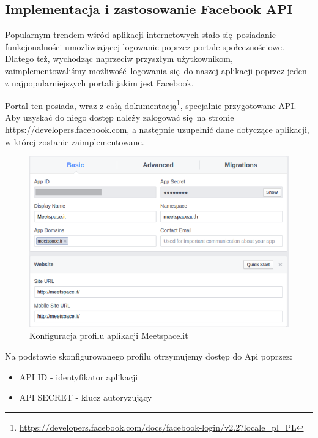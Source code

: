   

\subsection{Implementacja i zastosowanie Facebook API}
Popularnym trendem wśród aplikacji internetowych stało się posiadanie funkcjonalności umożliwiającej logowanie poprzez portale społecznościowe. Dlatego też, wychodząc naprzeciw przyszłym użytkownikom, zaimplementowaliśmy możliwość logowania się do naszej aplikacji poprzez jeden z najpopularniejszych portali jakim jest Facebook.

Portal ten posiada, wraz z całą dokumentacją\footnote{\url{https://developers.facebook.com/docs/facebook-login/v2.2?locale=pl\_PL}}, specjalnie przygotowane API. Aby uzyskać do niego dostęp należy zalogować się na stronie \url{https://developers.facebook.com}, a następnie uzupełnić dane dotyczące aplikacji, w której zostanie zaimplementowane. \\

\begin{figure}[h]
  \centering
    \includegraphics[scale=0.65]{images/fb_settings.png}
  \caption{Konfiguracja profilu aplikacji Meetspace.it}
\end{figure}

\clearpage

Na podstawie skonfigurowanego profilu otrzymujemy dostęp do Api poprzez:

\begin{itemize}
  \item API ID - identyfikator aplikacji
  \item API SECRET - klucz autoryzujący
\end{itemize}

